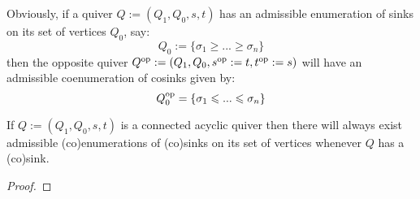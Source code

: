             \begin{remark}
                Obviously, if a quiver $Q := (Q_1, Q_0, s, t)$ has an admissible enumeration of sinks on its set of vertices $Q_0$, say:
                    $$Q_0 := \{\sigma_1 \geq ... \geq \sigma_n\}$$
                then the opposite quiver $Q^{\mathrm{op}} := (Q_1, Q_0, s^{\mathrm{op}} := t, t^{\mathrm{op}} := s)$ will have an admissible coenumeration of cosinks given by:
                    $$Q^{\mathrm{op}}_0 = \{\sigma_1 \leqslant ... \leqslant \sigma_n\}$$
            \end{remark}
            \begin{proposition} \label{prop: existence_of_admissible_enumerations}
                If $Q := (Q_1, Q_0, s, t)$ is a connected acyclic quiver then there will always exist admissible (co)enumerations of (co)sinks on its set of vertices whenever $Q$ has a (co)sink. 
            \end{proposition}
                \begin{proof}
                    
                \end{proof}
                
